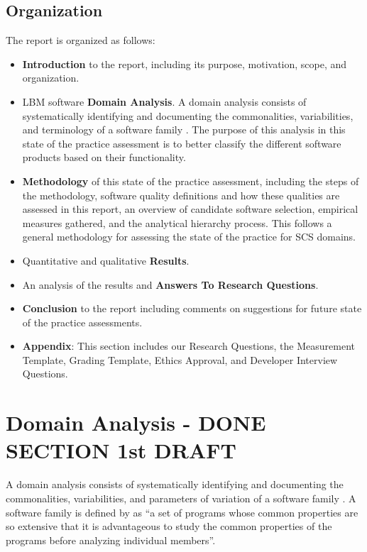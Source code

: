 \documentclass[12pt, notitlepage]{article}
\begin{document}
\subsection{Organization}

The report is organized as follows:

\begin{itemize}
	\item \textbf{Introduction} to the report, including its purpose, motivation, scope, and organization.
	\item LBM software \textbf{Domain Analysis}. A domain analysis consists of systematically identifying and documenting the commonalities, variabilities, and terminology of a software family \citep{Weiss1997}.
	The purpose of this analysis in this state of the practice assessment is to better classify the different software products based on their functionality.
	\item \textbf{Methodology} of this state of the practice assessment, including the steps of the methodology, software quality definitions and how these qualities are assessed in this report, an overview of candidate software selection, empirical measures gathered, and the analytical hierarchy process. This follows a general methodology for assessing the state of the practice for SCS domains.
	\item Quantitative and qualitative \textbf{Results}. 
	\item An analysis of the results and \textbf{Answers To Research Questions}.
	\item \textbf{Conclusion} to the report including comments on suggestions for future state of the practice assessments.
	\item \textbf{Appendix}: This section includes our Research Questions, the Measurement Template, Grading Template, Ethics Approval, and Developer Interview Questions.
\end{itemize}

\newpage

\section{Domain Analysis - DONE SECTION 1st DRAFT}\label{domainanalysis}

A domain analysis consists of systematically identifying and documenting the commonalities, variabilities, and parameters of variation of a software family \citep{Weiss1997}. A software family is defined by \cite{parnas1976design} as “a set of programs whose common properties are so extensive that it is advantageous to study the common properties of the programs before analyzing individual members”. 
\end{document}
